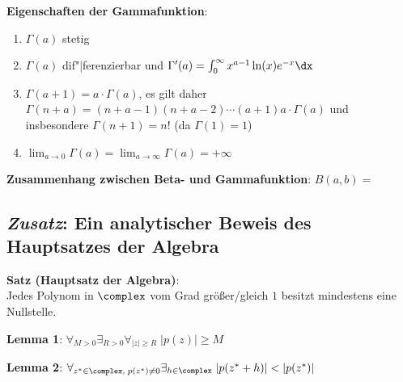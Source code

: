 \textbf{Eigenschaften der Gammafunktion}:
\begin{enumerate}
    \item
    $\Gamma(a)$ stetig

    \item
    $\Gamma(a)$ dif"|ferenzierbar und
    $\Gamma'(a) = \int_0^\infty x^{a-1} \ln(x) e^{-x} \dx$

    \item
    $\Gamma(a + 1) = a \cdot \Gamma(a)$, es gilt daher
    $\Gamma(n + a) = (n + a - 1) (n + a - 2) \dotsm (a + 1) a \cdot \Gamma(a)$
    und insbesondere $\Gamma(n + 1) = n!$
    (da $\Gamma(1) = 1$)

    \item
    $\lim_{a \to 0} \Gamma(a) = \lim_{a \to \infty} \Gamma(a) = +\infty$
\end{enumerate}

\linie

\textbf{Zusammenhang zwischen Beta- und Gammafunktion}:
$B(a, b) =$ 

\subsection{%
    \emph{Zusatz}: Ein analytischer Beweis des Hauptsatzes der Algebra%
}

\textbf{Satz (Hauptsatz der Algebra)}: \\
Jedes Polynom in $\complex$ vom Grad größer/gleich $1$ besitzt mindestens
eine Nullstelle.

\textbf{Lemma 1}:
$\forall_{M > 0} \exists_{R > 0} \forall_{|z| \ge R}\; |p(z)| \ge M$

\textbf{Lemma 2}:
$\forall_{z^\ast \in \complex,\; p(z^\ast) \not= 0} \exists_{h \in \complex}\;
|p(z^\ast + h)| < |p(z^\ast)|$

\pagebreak

